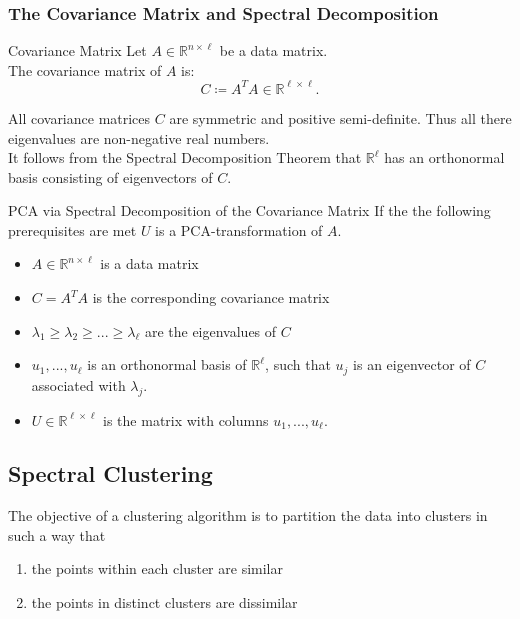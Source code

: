 \documentclass[english]{panikzettel}
\begin{document}
\subsubsection{The Covariance Matrix and Spectral Decomposition}
\begin{halfboxl}
\vspace{-\baselineskip}
	\begin{defi}{Covariance Matrix}
	Let $A\in\mathbb{R}^{n\times \ell}$ be a data matrix. \\
	The covariance matrix of $A$ is:
	\[
	C\coloneqq A^TA\in\mathbb{R}^{\ell\times\ell}.
	\]
	\end{defi}
\end{halfboxl}
\begin{halfboxr}
\vspace{-\baselineskip}
	All covariance matrices $C$ are symmetric and positive semi-definite. Thus all there eigenvalues are non-negative real numbers.\\
	It follows from the Spectral Decomposition Theorem that $\mathbb{R}^\ell$ has an orthonormal basis consisting of eigenvectors of $C$.
\end{halfboxr}

\begin{theo}{PCA via Spectral Decomposition of the Covariance Matrix}
If the the following prerequisites are met $U$ is a PCA-transformation of $A$.
\begin{itemize}
\item $A\in \mathbb{R}^{n\times \ell}$ is a data matrix
\item $C=A^TA$ is the corresponding covariance matrix
\item $\lambda_1\geq \lambda_2 \geq ...\geq \lambda_\ell$ are the eigenvalues of $C$
\item $u_1,...,u_\ell$ is an orthonormal basis of $\mathbb{R}^\ell$, such that $u_j$ is an eigenvector of $C$ associated with $\lambda_j$.
\item $U\in\mathbb{R}^{\ell\times\ell}$ is the matrix with columns $u_1,...,u_\ell$.
\end{itemize}
\end{theo}

\subsection{Spectral Clustering}
The objective of a clustering algorithm is to partition the data into clusters in such a way that
\begin{enumerate}
\item the points within each cluster are similar
\item the points in distinct clusters are dissimilar
\end{enumerate}
\end{document}
